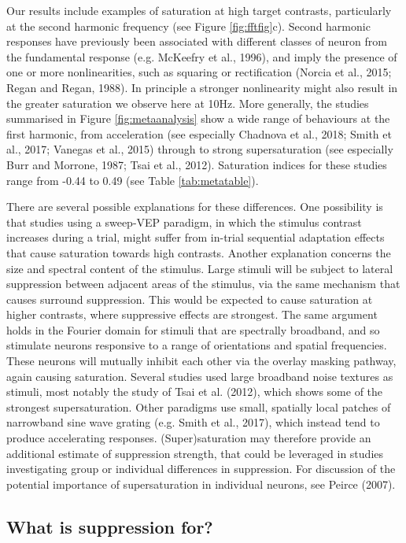 \documentclass[]{article}
\begin{document}
Our results include examples of saturation at high target contrasts, particularly at the second harmonic frequency (see Figure \ref{fig:fftfig}c). Second harmonic responses have previously been associated with different classes of neuron from the fundamental response (e.g. McKeefry et al., 1996), and imply the presence of one or more nonlinearities, such as squaring or rectification (Norcia et al., 2015; Regan and Regan, 1988). In principle a stronger nonlinearity might also result in the greater saturation we observe here at 10Hz. More generally, the studies summarised in Figure \ref{fig:metaanalysis} show a wide range of behaviours at the first harmonic, from acceleration (see especially Chadnova et al., 2018; Smith et al., 2017; Vanegas et al., 2015) through to strong supersaturation (see especially Burr and Morrone, 1987; Tsai et al., 2012). Saturation indices for these studies range from -0.44 to 0.49 (see Table \ref{tab:metatable}).

There are several possible explanations for these differences. One possibility is that studies using a sweep-VEP paradigm, in which the stimulus contrast increases during a trial, might suffer from in-trial sequential adaptation effects that cause saturation towards high contrasts. Another explanation concerns the size and spectral content of the stimulus. Large stimuli will be subject to lateral suppression between adjacent areas of the stimulus, via the same mechanism that causes surround suppression. This would be expected to cause saturation at higher contrasts, where suppressive effects are strongest. The same argument holds in the Fourier domain for stimuli that are spectrally broadband, and so stimulate neurons responsive to a range of orientations and spatial frequencies. These neurons will mutually inhibit each other via the overlay masking pathway, again causing saturation. Several studies used large broadband noise textures as stimuli, most notably the study of Tsai et al. (2012), which shows some of the strongest supersaturation. Other paradigms use small, spatially local patches of narrowband sine wave grating (e.g. Smith et al., 2017), which instead tend to produce accelerating responses. (Super)saturation may therefore provide an additional estimate of suppression strength, that could be leveraged in studies investigating group or individual differences in suppression. For discussion of the potential importance of supersaturation in individual neurons, see Peirce (2007).

\hypertarget{what-is-suppression-for}{%
\subsection{What is suppression for?}\label{what-is-suppression-for}}
\end{document}
